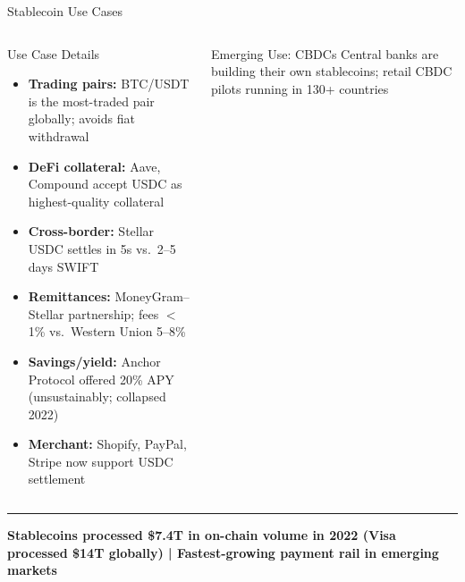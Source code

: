 \documentclass[8pt,aspectratio=169]{beamer}
\newcommand{\bottomnote}[1]{\vfill\vspace{-2mm}\textcolor{mllavender2}{\rule{\textwidth}{0.4pt}}\vspace{1mm}\footnotesize\textbf{#1}}
\begin{document}
\begin{frame}{Stablecoin Use Cases}
\begin{columns}[T]
\begin{block}{Use Case Details}
\begin{itemize}\setlength{\itemsep}{2pt}
  \item \textbf{Trading pairs:} BTC/USDT is the most-traded pair globally; avoids fiat withdrawal
  \item \textbf{DeFi collateral:} Aave, Compound accept USDC as highest-quality collateral
  \item \textbf{Cross-border:} Stellar USDC settles in 5s vs.\ 2--5 days SWIFT
  \item \textbf{Remittances:} MoneyGram--Stellar partnership; fees $<$1\% vs.\ Western Union 5--8\%
  \item \textbf{Savings/yield:} Anchor Protocol offered 20\% APY (unsustainably; collapsed 2022)
  \item \textbf{Merchant:} Shopify, PayPal, Stripe now support USDC settlement
\end{itemize}
\end{block}
\vspace{1mm}
\begin{alertblock}{Emerging Use: CBDCs}
\scriptsize Central banks are building their own stablecoins; retail CBDC pilots running in 130+ countries
\end{alertblock}
\end{columns}
\bottomnote{Stablecoins processed \$7.4T in on-chain volume in 2022 (Visa processed \$14T globally) | Fastest-growing payment rail in emerging markets}
\end{frame}
\end{document}
